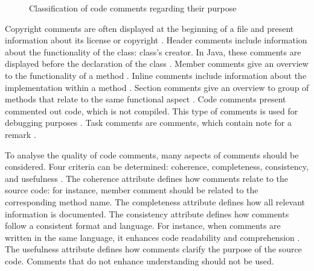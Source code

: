 \begin{figure}[H]
\centering
{}
\caption{Classification of code comments regarding their purpose
\cite{hassan2022code}}
\label{fig:comment_classification}
\end{figure}





Copyright comments are often displayed at the beginning of a file and present information about its license or copyright \cite{steidl2013quality}. Header comments include information about the functionality of the class: class's creator. In Java, these comments are displayed before the declaration of the class \cite{hassan2022code}. Member comments give an overview to the functionality of a method \cite{steidl2013quality}. Inline comments include information about the implementation within a method \cite{steidl2013quality}. Section comments give an overview to group of methods that relate to the same functional aspect \cite{hassan2022code}. Code comments present commented out code, which is not compiled. This type of comments is used for debugging purposes \cite{steidl2013quality}. Task comments are comments, which contain note for a remark \cite{steidl2013quality}.



To analyse the quality of code comments, many aspects of comments should be considered. Four criteria can be determined: coherence, completeness, consistency, and usefulness \cite{steidl2013quality}.
The coherence attribute defines how comments relate to the source code: for instance, member comment should be related to the corresponding method name.
The completeness attribute defines how all relevant information is documented. 
The consistency attribute defines how comments follow a consistent format and language. For instance, when comments are written in the same language, it enhances code readability and comprehension \cite{steidl2013quality}.
The usefulness attribute defines how comments clarify the purpose of the source code. Comments that do not enhance understanding should not be used. 


